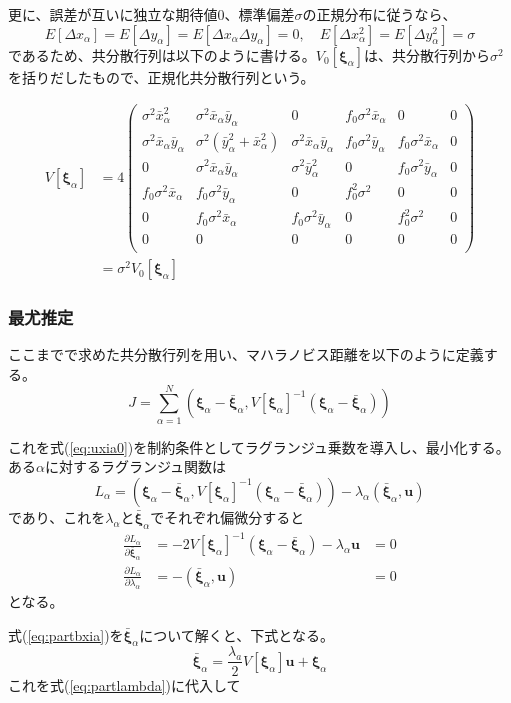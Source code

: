 \documentclass[12pt,a4j]{jsarticle}
\newcommand{\bxa}{\bar{x}_\alpha}
\newcommand{\dxa}{\Delta x_\alpha}
\newcommand{\bya}{\bar{y}_\alpha}
\newcommand{\dya}{\Delta y_\alpha}
\newcommand{\xia}{\bm{\xi}_\alpha}
\newcommand{\bxia}{\bar{\bm{\xi}}_\alpha}
\begin{document}
      更に、誤差が互いに独立な期待値$0$、標準偏差$\sigma$の正規分布に従うなら、
      \begin{equation}
        E[\dxa] = E[\dya] = E[\dxa\dya] = 0, \quad E[\dxa^2] = E[\dya^2] = \sigma
      \end{equation}
      であるため、共分散行列は以下のように書ける。$V_0[\xia]$は、共分散行列から$\sigma^2$を括りだしたもので、正規化共分散行列という。

      \begin{align}
        V[\xia] &= 4 \begin{pmatrix}
          \sigma^2\bxa^2 & \sigma^2\bxa\bya & 0 & f_0\sigma^2\bxa & 0 & 0 \\
          \sigma^2\bxa\bya & \sigma^2(\bya^2 + \bxa^2) & \sigma^2\bxa\bya & f_0\sigma^2\bya & f_0\sigma^2\bxa & 0 \\
          0 & \sigma^2\bxa\bya & \sigma^2\bya^2 & 0 & f_0\sigma^2\bya & 0 \\
          f_0\sigma^2\bxa & f_0\sigma^2\bya & 0 & f_0^2\sigma^2 & 0 & 0 \\
          0 & f_0\sigma^2\bxa & f_0\sigma^2\bya & 0 & f_0^2\sigma^2 & 0 \\
          0 & 0 & 0 & 0 & 0 & 0 \\
        \end{pmatrix} \\
         &= \sigma^2 V_0[\xia] 
      \end{align}
    
    \subsubsection*{最尤推定}
      ここまでで求めた共分散行列を用い、マハラノビス距離を以下のように定義する。
      \begin{equation}
        J = \sum_{\alpha = 1}^N \left(\xia - \bxia, V[\xia]^{-1} (\xia - \bxia) \right)
      \end{equation}
      
      これを式(\ref{eq:uxia0})を制約条件としてラグランジュ乗数を導入し、最小化する。
      ある$\alpha$に対するラグランジュ関数は
      \begin{equation}
        L_\alpha = \left(\xia - \bxia, V[\xia]^{-1} (\xia - \bxia)\right) - \lambda_\alpha (\bxia, \bm{u}) \label{eq:La}
      \end{equation}
      であり、これを$\lambda_\alpha$と$\bxia$でそれぞれ偏微分すると
      \begin{align}
        \frac{\partial L_\alpha}{\partial \bxia} &= -2V[\xia]^{-1}(\xia - \bxia) - \lambda_\alpha\bm{u} &= 0 \label{eq:partbxia} \\
        \frac{\partial L_\alpha}{\partial \lambda_\alpha} &= -(\bxia, \bm{u}) &= 0 \label{eq:partlambda}
      \end{align}
      となる。

      式(\ref{eq:partbxia})を$\bxia$について解くと、下式となる。
      \begin{equation}
        \bxia = \frac{\lambda_a}{2}V[\xia]\bm{u} + \xia \label{eq:fbxia}
      \end{equation}
      これを式(\ref{eq:partlambda})に代入して
\end{document}
